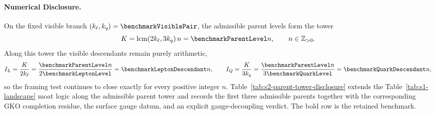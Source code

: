 \documentclass[11pt]{article}
\begin{document}
\paragraph*{Numerical Disclosure.}
On the fixed visible branch $(k_{\ell},k_q)=\benchmarkVisiblePair$, the admissible parent levels form the tower
\begin{equation}
 K=\operatorname{lcm}(2k_{\ell},3k_q)\,n=\benchmarkParentLevel n,
 \qquad n\in\mathbb Z_{>0}.
\end{equation}
Along this tower the visible descendants remain purely arithmetic,
\begin{equation}
 I_L=\frac{K}{2k_{\ell}}=\frac{\benchmarkParentLevel n}{2\benchmarkLeptonLevel}=\benchmarkLeptonDescendant n,
 \qquad
 I_Q=\frac{K}{3k_q}=\frac{\benchmarkParentLevel n}{3\benchmarkQuarkLevel}=\benchmarkQuarkDescendant n,
\end{equation}
so the framing test continues to close exactly for every positive integer $n$. Table~\ref{tab:s2-parent-tower-disclosure} extends the Table~\ref{tab:s1-landscape} moat logic along the admissible parent tower and records the first three admissible parents together with the corresponding GKO completion residue, the surface gauge datum, and an explicit gauge-decoupling verdict. The bold row is the retained benchmark.
\end{document}
